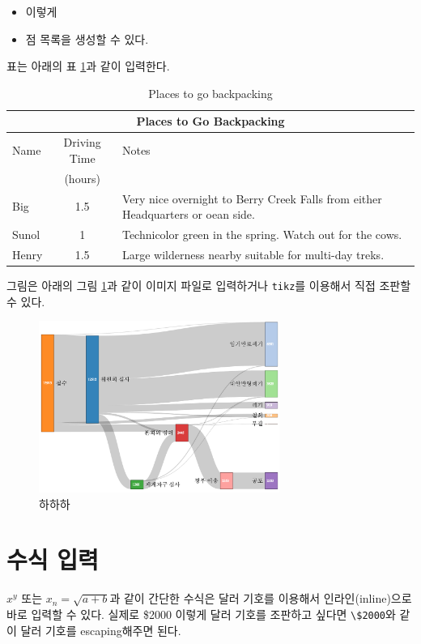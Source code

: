 \documentclass[11pt]{article}           %
\begin{document}
\begin{itemize}
   \item 이렇게
   \item 점 목록을 생성할 수 있다.
\end{itemize}

표는 아래의 표 \ref{tab:backpacking}과 같이 입력한다.

\begin{table}
\centering
    \begin{tabular}{|l|c|p{3.5in}|}
    \hline
    \multicolumn{3}{|c|}{Places to Go Backpacking}\\ \hline
    Name    & Driving Time  & Notes\\
            & (hours)       & \\ \hline
    Big     & 1.5           & Very nice overnight to Berry Creek Falls from
    either Headquarters or oean side.\\ \hline
    Sunol   & 1             & Technicolor green in the spring. Watch out for the cows.\\ \hline
    Henry   & 1.5           & Large wilderness nearby suitable for multi-day treks.\\ \hline
    \end{tabular}
    \caption{Places to go backpacking}
    \label{tab:backpacking}
\end{table}

그림은 아래의 그림 \ref{fig:sankey}과 같이 이미지 파일로 입력하거나 
\verb+tikz+를 이용해서  직접 조판할 수 있다.

\begin{figure}[t]
    \centering
    \includegraphics[width=0.7\textwidth]{sankey.png}
    \caption{하하하}
    \label{fig:sankey}
\end{figure}

\section{수식 입력}
$x^y$ 또는 $x_n = \sqrt{a + b}$과 같이 간단한 수식은 달러 기호를 이용해서 인라인(inline)으로 바로 입력할 수 있다.
실제로 \$2000 이렇게 달러 기호를 조판하고 싶다면 \verb+\$2000+와 같이 달러 기호를 escaping해주면 된다.
\end{document}
